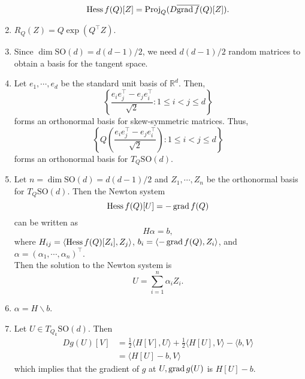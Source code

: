 \documentclass[en, oneside]{assignment}
\begin{document}
\begin{sol}
\begin{enumerate}[label=(\arabic*)]
\begin{equation*}
            \operatorname{Hess} f(Q) [Z] = \operatorname{Proj}_Q (D \overline {\operatorname{grad} f}(Q) [Z]).
        \end{equation*}
        \item $R_Q (Z) = Q \exp(Q^\top Z)$.
        \item Since $\dim \text{SO}(d) = d(d-1)/2$, we need $d(d-1)/2$ random matrices to obtain a basis for the tangent space.
        \item Let $e_1, \cdots, e_d$ be the standard unit basis of $\mathbb{R}^d$. Then,
        \begin{equation*}
            \left\{\frac{e_i e_j^\top - e_j e_i^\top}{\sqrt{2}}: 1 \leq i < j \leq d\right\}
        \end{equation*}
        forms an orthonormal basis for skew-symmetric matrices. Thus,
        \begin{equation*}
            \left\{Q \left(\frac{e_i e_j^\top - e_j e_i^\top}{\sqrt{2}}\right): 1 \leq i < j \leq d\right\}
        \end{equation*}
        forms an orthonormal basis for $T_Q \text{SO}(d)$.
        \item Let $n = \dim \text{SO}(d) = d(d-1)/2$ and $Z_1, \cdots, Z_n$ be the orthonormal basis for $T_Q \text{SO}(d)$. Then the Newton system
        \begin{equation*}
            \operatorname{Hess} f(Q)[U] = -\operatorname{grad} f(Q)
        \end{equation*}
        can be written as
        \begin{equation*}
            H \alpha = b,
        \end{equation*}
        where $H_{ij} = \langle \operatorname{Hess} f(Q)[Z_i], Z_j \rangle$, $b_i = \langle -\operatorname{grad} f(Q), Z_i \rangle$, and $\alpha = (\alpha_1, \cdots, \alpha_n)^\top$.\\
        Then the solution to the Newton system is
        \begin{equation*}
            U = \sum_{i=1}^n \alpha_i Z_i.
        \end{equation*}
        \item $\alpha = H \backslash b$.
        \item Let $U \in T_{Q_k} \text{SO}(d)$. Then
        \begin{align*}
            D g(U) [V] &= \frac{1}{2}\langle H [V], U \rangle + \frac{1}{2}\langle H [U], V \rangle - \langle b, V \rangle\\
            &= \langle H [U] - b, V \rangle
        \end{align*}
        which implies that the gradient of $g$ at $U, \operatorname{grad} g(U)$ is $H [U] - b$.\\

\end{enumerate}
\end{sol}
\end{document}
